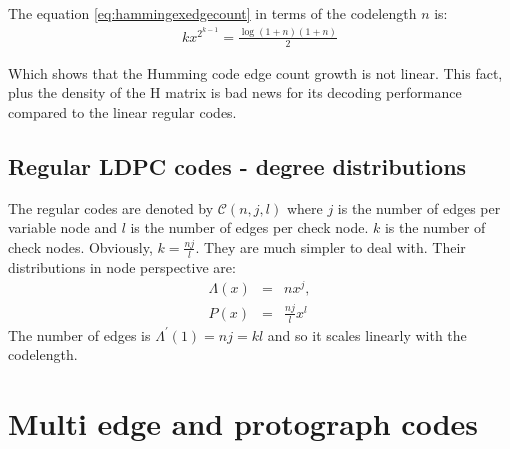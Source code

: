 The equation \ref{eq:hammingexedgecount} in terms of the codelength $n$ is:
\begin{eqnarray}
kx^{2^{k-1}} = \frac{\log(1+n)(1+n)}{2}
\end{eqnarray}

Which shows that the Humming code edge count growth is not linear. This fact, plus the density of the H matrix is bad news for its decoding performance compared to the linear regular codes.




\subsection{Regular LDPC codes - degree distributions}
The regular codes are denoted by $\mathcal{C}(n, j, l)$ where $j$ is the number of edges per variable node and $l$ is the number of edges per check node. $k$ is the number of check nodes. Obviously, $k=\frac{nj}{l}$. They are much simpler to deal with.
Their distributions in node perspective are:
\begin{eqnarray}
\Lambda(x) &=& nx^j, \\
P(x) &=& \frac{nj}{l}x^{l}
\end{eqnarray}
The number of edges is $\Lambda^\prime(1) = nj = kl$ and so it scales linearly with the codelength.


\section{Multi edge and protograph codes}
\newpage
